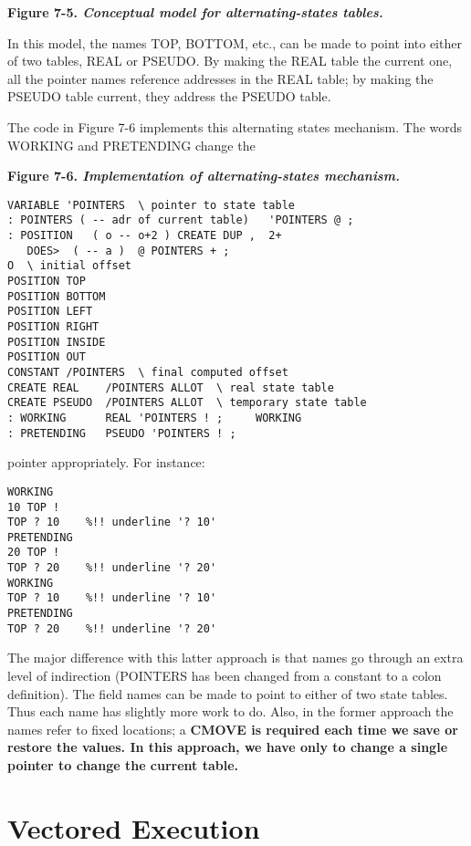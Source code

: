 \bf{Figure 7-5.} \emph{Conceptual model for alternating-states tables.}


In this model, the names TOP, BOTTOM, etc., can be made to point
into either of two tables, REAL or PSEUDO. By making the REAL table
the current one, all the pointer names reference addresses in the REAL
table; by making the PSEUDO table current, they address the PSEUDO
table.

The code in Figure 7-6 implements this alternating states
mechanism. The words WORKING and PRETENDING change the

\bf{Figure 7-6.} \emph{Implementation of alternating-states mechanism.}

\begin{verbatim}
VARIABLE 'POINTERS  \ pointer to state table
: POINTERS ( -- adr of current table)   'POINTERS @ ;
: POSITION   ( o -- o+2 ) CREATE DUP ,  2+
   DOES>  ( -- a )  @ POINTERS + ;
O  \ initial offset
POSITION TOP
POSITION BOTTOM
POSITION LEFT
POSITION RIGHT
POSITION INSIDE
POSITION OUT
CONSTANT /POINTERS  \ final computed offset
CREATE REAL    /POINTERS ALLOT  \ real state table
CREATE PSEUDO  /POINTERS ALLOT  \ temporary state table
: WORKING      REAL 'POINTERS ! ;     WORKING
: PRETENDING   PSEUDO 'POINTERS ! ;
\end{verbatim}

pointer appropriately. For instance:

\begin{verbatim}
WORKING
10 TOP !
TOP ? 10	%!! underline '? 10'
PRETENDING
20 TOP !
TOP ? 20	%!! underline '? 20'
WORKING
TOP ? 10	%!! underline '? 10'
PRETENDING
TOP ? 20	%!! underline '? 20'
\end{verbatim}

The major difference with this latter approach is that names go through
an extra level of indirection (POINTERS has been changed from a
constant to a colon definition). The field names can be made to point to
either of two state tables. Thus each name has slightly more work to do.
Also, in the former approach the names refer to fixed locations; a
\bf{CMOVE} is required each time we save or restore the values. In this
approach, we have only to change a single pointer to change the current
table.

\section{Vectored Execution}

